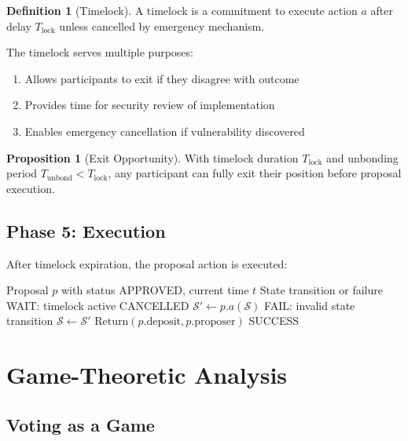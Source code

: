 \documentclass[11pt,a4paper]{article}
\theoremstyle{definition}
\newtheorem{definition}{Definition}[section]
\newtheorem{proposition}[theorem]{Proposition}
\theoremstyle{remark}
\begin{document}
\begin{definition}[Timelock]
A timelock is a commitment to execute action $a$ after delay $T_{\text{lock}}$ unless cancelled by emergency mechanism.
\end{definition}

The timelock serves multiple purposes:
\begin{enumerate}
    \item Allows participants to exit if they disagree with outcome
    \item Provides time for security review of implementation
    \item Enables emergency cancellation if vulnerability discovered
\end{enumerate}

\begin{proposition}[Exit Opportunity]
With timelock duration $T_{\text{lock}}$ and unbonding period $T_{\text{unbond}} < T_{\text{lock}}$, any participant can fully exit their position before proposal execution.
\end{proposition}

\subsection{Phase 5: Execution}

After timelock expiration, the proposal action is executed:

\begin{algorithm}
\caption{Proposal Execution}
\begin{algorithmic}[1]
\Require Proposal $p$ with status APPROVED, current time $t$
\Ensure State transition or failure
    \State \Return WAIT: timelock active
\EndIf
{}
    \State \Return CANCELLED
\EndIf
\State $\mathcal{S}' \gets p.a(\mathcal{S})$
    \State \Return FAIL: invalid state transition
\EndIf
\State $\mathcal{S} \gets \mathcal{S}'$
\State $\text{Return}(p.\text{deposit}, p.\text{proposer})$
\State \Return SUCCESS
\end{algorithmic}
\end{algorithm}

\section{Game-Theoretic Analysis}

\subsection{Voting as a Game}
\end{document}
